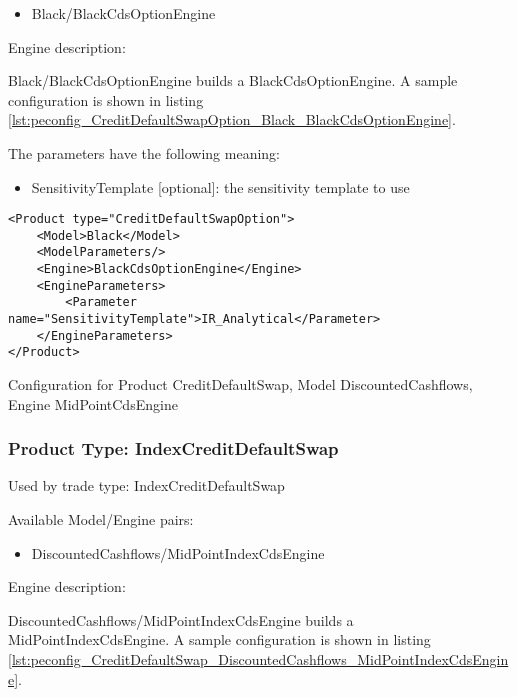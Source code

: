 \begin{itemize}
\item Black/BlackCdsOptionEngine
\end{itemize}

Engine description:

Black/BlackCdsOptionEngine builds a BlackCdsOptionEngine. A sample configuration is shown in listing
\ref{lst:peconfig_CreditDefaultSwapOption_Black_BlackCdsOptionEngine}.

The parameters have the following meaning:

\begin{itemize}
\item SensitivityTemplate [optional]: the sensitivity template to use 
\end{itemize}

\begin{longlisting}
\begin{verbatim}
<Product type="CreditDefaultSwapOption">
    <Model>Black</Model>
    <ModelParameters/>
    <Engine>BlackCdsOptionEngine</Engine>
    <EngineParameters>
        <Parameter name="SensitivityTemplate">IR_Analytical</Parameter>
    </EngineParameters>
</Product>
\end{verbatim}
\caption{Configuration for Product CreditDefaultSwap, Model DiscountedCashflows, Engine MidPointCdsEngine}
\label{lst:peconfig_CreditDefaultSwapOption_Black_BlackCdsOptionEngine}
\end{longlisting}

\subsubsection{Product Type: IndexCreditDefaultSwap}

Used by trade type: IndexCreditDefaultSwap

Available Model/Engine pairs:

\begin{itemize}
\item DiscountedCashflows/MidPointIndexCdsEngine
\end{itemize}

Engine description:

DiscountedCashflows/MidPointIndexCdsEngine builds a MidPointIndexCdsEngine. A sample configuration is shown in listing
\ref{lst:peconfig_CreditDefaultSwap_DiscountedCashflows_MidPointIndexCdsEngine}.

